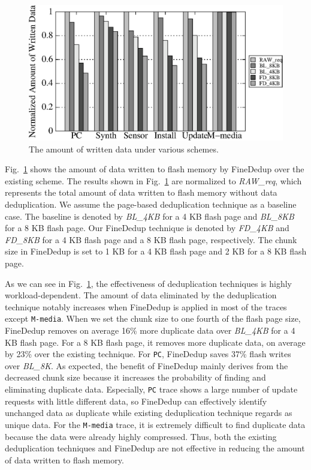 \begin{figure}[t]
	\center
	\includegraphics[scale=0.6]{figure/finededup/dataReduction_Chunksize_less}
	\caption{The amount of written data under various schemes.} %
	\label{fig:reducedData}
\end{figure}


Fig.~\ref{fig:reducedData} shows the amount of data written to flash memory by FineDedup over the existing scheme.
The results shown in Fig.~\ref{fig:reducedData} are normalized to \textit{RAW\_req},
which represents the total amount of data written to flash memory without data deduplication.
We assume the page-based deduplication technique as a baseline case.
The baseline is denoted by \textit{BL\_4KB} for a 4 KB flash page and \textit{BL\_8KB} for a 8 KB flash page.
Our FineDedup technique is denoted by \textit{FD\_4KB} and \textit{FD\_8KB} for a 4 KB flash page and 
a 8 KB flash page, respectively.
The chunk size in FineDedup is set to 1 KB for a 4 KB flash page and 2 KB for a 8 KB flash page.

As we can see in Fig.~\ref{fig:reducedData}, 
the effectiveness of deduplication techniques is highly workload-dependent. 
The amount of data eliminated by the deduplication technique notably increases 
when FineDedup is applied in most of the traces except \texttt{M-media}.
When we set the chunk size to one fourth of the flash page size, 
FineDedup removes on average 16\% more duplicate data 
over \textit{BL\_4KB} for a 4 KB flash page.
For a 8 KB flash page, 
it removes more duplicate data, on average by 23\% over the existing technique.
For \texttt{PC}, FineDedup saves 37\% flash writes over \textit{BL\_8K}.
As expected, the benefit of FineDedup mainly derives from the decreased chunk size 
because it increases the probability of finding and eliminating duplicate data.
Especially, \texttt{PC} trace shows a large number of update requests with little different data, so FineDedup can effectively 
identify unchanged data as duplicate while existing deduplication technique regards as unique data.
For the \texttt{M-media} trace, 
it is extremely difficult to find duplicate data because the data were already highly compressed.
Thus, both the existing deduplication techniques and FineDedup are not effective in reducing the 
amount of data written to flash memory.

